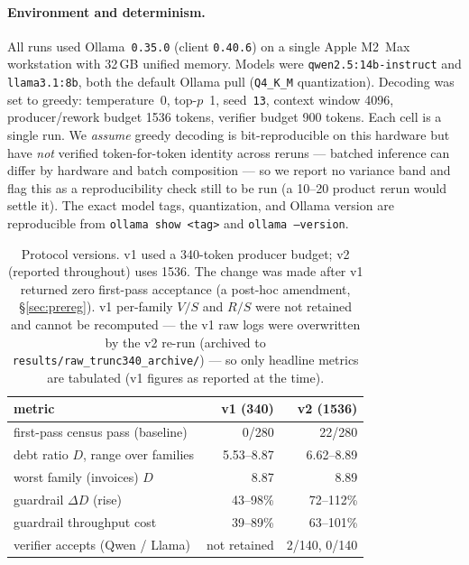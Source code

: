 \documentclass[11pt]{article}
\newcommand{\D}{\ensuremath{D}}
\newcommand{\SV}{\ensuremath{S}}
\newcommand{\VV}{\ensuremath{V}}
\newcommand{\RV}{\ensuremath{R}}
\begin{document}
\paragraph{Environment and determinism.} All runs used Ollama~\texttt{0.35.0} (client
\texttt{0.40.6}) on a single Apple M2~Max workstation with 32\,GB unified memory. Models were
\texttt{qwen2.5:14b-instruct} and \texttt{llama3.1:8b}, both the default Ollama pull
(\texttt{Q4\_K\_M} quantization). Decoding was set to greedy: temperature~0, top-$p$~1,
seed~\texttt{13}, context window 4096, producer/rework budget 1536 tokens, verifier budget 900
tokens. Each cell is a single run. We \emph{assume} greedy decoding is bit-reproducible on this
hardware but have \emph{not} verified token-for-token identity across reruns --- batched inference
can differ by hardware and batch composition --- so we report no variance band and flag this as a
reproducibility check still to be run (a 10--20 product rerun would settle it).
The exact model tags, quantization, and Ollama version are reproducible from
\texttt{ollama show <tag>} and \texttt{ollama --version}.

\begin{table}[h]
\centering
\small
\caption{Protocol versions. v1 used a 340-token producer budget; v2 (reported throughout) uses
1536. The change was made after v1 returned zero first-pass acceptance (a post-hoc amendment,
\S\ref{sec:prereg}). v1 per-family $\VV/\SV$ and $\RV/\SV$ were not retained and cannot be
recomputed --- the v1 raw logs were overwritten by the v2 re-run (archived to
\texttt{results/raw\_trunc340\_archive/}) --- so only headline metrics are tabulated (v1 figures as
reported at the time).}
\label{tab:versions}
\begin{tabular}{lrr}
\toprule
metric & v1 (340) & v2 (1536) \\
\midrule
first-pass census pass (baseline)          & 0/280        & 22/280 \\
debt ratio $\D$, range over families       & 5.53--8.87   & 6.62--8.89 \\
worst family (invoices) $\D$               & 8.87         & 8.89 \\
guardrail $\Delta\D$ (rise)                & 43--98\%     & 72--112\% \\
guardrail throughput cost                  & 39--89\%     & 63--101\% \\
verifier accepts (Qwen / Llama)            & not retained & 2/140, 0/140 \\
\bottomrule
\end{tabular}
\end{table}
\end{document}
